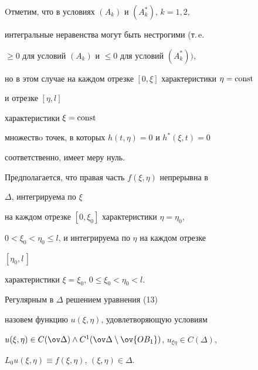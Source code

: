 \begin{note}


Oтметим, что в условиях $(A_k)$ и $(A_k^*)$, $k=1,2$, 


интегральные неравенства могут быть нестрогими (т.\,e.


$\ge 0$ для условий $(A_k)$ и $\le 0$ для условий $(A_k^*))$,


но в этом случае на каждом отрезке $[0,\xi]$ характеристики $\eta=\operatorname{const}$


и отрезке $[\eta,l]$


характеристики $\xi=\operatorname{const}$


множествo точек, в которых $h(t,\eta)=0$ и $h^*(\xi,t)=0$


соответственно, имеет меру нуль.


\end{note}





Предполагается, что правая часть $f(\xi, \eta)$ непрерывна в 


$\Delta$, интегрируема по $\xi$


на каждом отрезке $[0,\xi_0]$ характеристики $ \eta=\eta_0$,


$0<\xi_0<\eta_0 \le l$, и интегрируема по $\eta$ на каждом отрезке


$[\eta_0, l\,]$


характеристики $\xi=\xi_0$, $0\le \xi_0<\eta_0 < l$. 





\begin{defn}


Регулярным в $\Delta$ решением уравнения (13)


назовем функцию $u(\xi,\eta)$, удовлетворяющую условиям


$u(\xi,\eta)\in C(\ov \Delta)\land C^1(\ov \Delta \setminus


\ov {OB_1})$, $u_{\xi \eta }\in C(\Delta)$,


$L_0u(\xi,\eta)\equiv f(\xi,\eta)$, $(\xi,\eta)\in \Delta$.


\end{defn}





